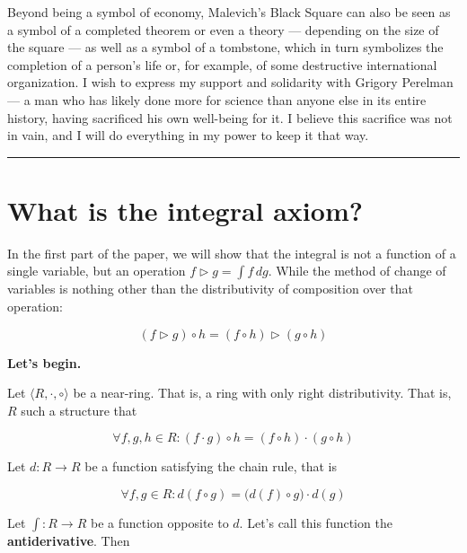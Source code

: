 \documentclass[12pt]{article}
\theoremstyle{definition}
\begin{document}
\vspace{5pt}

Beyond being a symbol of economy, Malevich’s Black Square can also be seen as a symbol of a 
completed theorem or even a theory — depending on the size of the square — as well as a 
symbol of a tombstone, which in turn symbolizes the completion of a person’s life or, 
for example, of some destructive international organization. 
I wish to express my support and solidarity with Grigory Perelman — a man who has likely done 
more for science than anyone else in its entire history, 
having sacrificed his own well-being for it. I believe this sacrifice was not in vain, 
and I will do everything in my power to keep it that way.

\vspace{25pt}
\begin{center}
\rule{7cm}{7cm}
\end{center}


\newpage

\section*{What is the integral axiom?}

In the first part of the paper, we will show that the integral is not a function of a single variable, 
but an operation $f \triangleright g = \int f \, dg$. While the method of change of variables is 
nothing other than the distributivity of composition over that operation:

\[
(f \triangleright g) \circ h = (f \circ h) \triangleright (g \circ h)
\]

\noindent \textbf{Let's begin.}

\vspace{20pt}
\noindent Let $\langle R, \cdot, \circ \rangle$ be a near-ring. That is, a ring with only right distributivity. 
That is, $R$ such a structure that 

\[
\forall f, g, h \in R: (f \cdot g) \circ h = (f \circ h) \cdot (g \circ h)
\]

\vspace{5pt}

\noindent Let $d \colon R \to R$ be a function satisfying the chain rule, that is

\[
\forall f, g \in R: d(f \circ g) = \big(d(f) \circ g \big) \cdot d(g)
\]

\vspace{5pt}

\noindent Let $\int \colon R \to R$ be a function opposite to $d$. 
Let's call this function the \textbf{antiderivative}. Then
\end{document}
